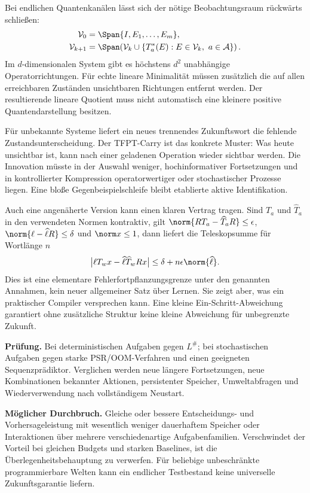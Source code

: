 Bei endlichen Quantenkanälen lässt sich der nötige Beobachtungsraum rückwärts schließen:
\begin{align}
\mathcal V_0&=\Span\{I,E_1,\ldots,E_m\},\\
\mathcal V_{k+1}&=\Span\!\left(\mathcal V_k\cup
\{T_a^*(E):E\in\mathcal V_k,\ a\in\mathcal A\}\right).
\end{align}
Im $d$-dimensionalen System gibt es höchstens $d^2$ unabhängige Operatorrichtungen. Für echte lineare Minimalität müssen zusätzlich die auf allen erreichbaren Zuständen unsichtbaren Richtungen entfernt werden. Der resultierende lineare Quotient muss nicht automatisch eine kleinere positive Quantendarstellung besitzen.

Für unbekannte Systeme liefert ein neues trennendes Zukunftswort die fehlende Zustandsunterscheidung. Der TFPT-Carry ist das konkrete Muster: Was heute unsichtbar ist, kann nach einer geladenen Operation wieder sichtbar werden. Die Innovation müsste in der Auswahl weniger, hochinformativer Fortsetzungen und in kontrollierter Kompression operatorwertiger oder stochastischer Prozesse liegen. Eine bloße Gegenbeispielschleife bleibt etablierte aktive Identifikation.

Auch eine angenäherte Version kann einen klaren Vertrag tragen. Sind $T_a$ und $\widehat T_a$ in den verwendeten Normen kontraktiv, gilt $\norm{RT_a-\widehat T_aR}\le\epsilon$, $\norm{\ell-\widehat\ell R}\le\delta$ und $\norm x\le1$, dann liefert die Teleskopsumme für Wortlänge $n$
\begin{equation}
\bigl|\ell T_wx-\widehat\ell\widehat T_wRx\bigr|
\le\delta+n\epsilon\norm{\widehat\ell}.
\end{equation}
Dies ist eine elementare Fehlerfortpflanzungsgrenze unter den genannten Annahmen, kein neuer allgemeiner Satz über Lernen. Sie zeigt aber, was ein praktischer Compiler versprechen kann. Eine kleine Ein-Schritt-Abweichung garantiert ohne zusätzliche Struktur keine kleine Abweichung für unbegrenzte Zukunft.

\textbf{Prüfung.} Bei deterministischen Aufgaben gegen $L^\#$; bei stochastischen Aufgaben gegen starke PSR/OOM-Verfahren und einen geeigneten Sequenzprädiktor. Verglichen werden neue längere Fortsetzungen, neue Kombinationen bekannter Aktionen, persistenter Speicher, Umweltabfragen und Wiederverwendung nach vollständigem Neustart.

\textbf{Möglicher Durchbruch.} Gleiche oder bessere Entscheidungs- und Vorhersageleistung mit wesentlich weniger dauerhaftem Speicher oder Interaktionen über mehrere verschiedenartige Aufgabenfamilien. Verschwindet der Vorteil bei gleichen Budgets und starken Baselines, ist die Überlegenheitsbehauptung zu verwerfen. Für beliebige unbeschränkte programmierbare Welten kann ein endlicher Testbestand keine universelle Zukunftsgarantie liefern.

